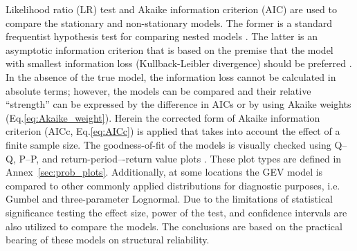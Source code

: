 Likelihood ratio (LR) test and Akaike information criterion (AIC) are used to compare the stationary and non-stationary models. The former is a standard frequentist hypothesis test for comparing nested models \citep{Wilks1938}. The latter is an asymptotic information criterion that is based on the premise that the model with smallest information loss (Kullback-Leibler divergence) should be preferred \citep{Wit2012}. In the absence of the true model, the information loss cannot be calculated in absolute terms; however, the models can be compared and their relative ``strength'' can be expressed by the difference in AICs or by using Akaike weights (Eq.\ref{eq:Akaike_weight}). Herein the corrected form of Akaike information criterion (AICc, Eq.\ref{eq:AICc}) is applied that takes into account the effect of a finite sample size. The goodness-of-fit of the models is visually checked using Q–Q, P–P, and return-period–-return value plots \citep{Coles2001}. These plot types are defined in Annex~\ref{sec:prob_plots}. Additionally, at some locations the GEV model is compared to other commonly applied distributions for diagnostic purposes, i.e. Gumbel and three-parameter Lognormal. Due to the limitations of statistical significance testing \citep{Carver1993} the effect size, power of the test, and confidence intervals are also utilized to compare the models. The conclusions are based on the practical bearing of these models on structural reliability.



